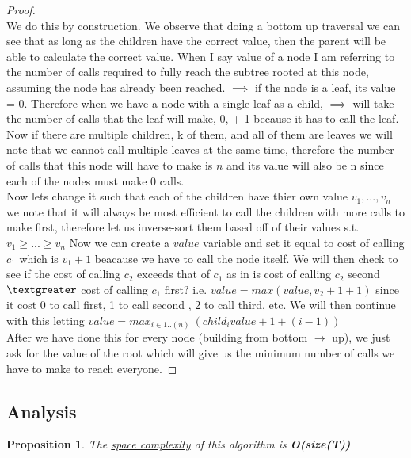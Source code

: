 \documentclass[12pt]{article}
\newtheorem{proposition}[theorem]{Proposition}
\begin{document}
\begin{proof}
~ \\ \indent We do this by construction. We observe that doing a bottom up traversal we can
see that as long as the children have the correct value, then the parent will be able to
calculate the correct value. When I say value of a node I am referring to the number
of calls required to fully reach the subtree rooted at this node, assuming the node has
already been reached. $\implies$ if the node is a leaf, its value = 0. Therefore when we have
a node with a single leaf as a child, $\implies$ will take the number of calls that the
leaf will make, 0, + 1 because it has to call the leaf. Now if there are multiple children,
k of them, and all of them are leaves we will note that we cannot call multiple leaves at
the same time, therefore the number of calls that this node will have to make is $n$ and
its value will also be n since each of the nodes must make 0 calls. \\
\indent Now lets change it such that each of the children have thier own value $v_1,...,v_n$
we note that it will always be most efficient to call the children with more calls to make
first, therefore let us inverse-sort them based off of their values s.t. $v_1\geq...\geq v_n$
Now we can create a $value$ variable and set it equal to cost of calling $c_1$ which is
$v_1 + 1$ beacause we have to call the node itself. We will then check to see if the cost of calling
$c_2$ exceeds that of $c_1$ as in is cost of calling $c_2$ second $\textgreater$ cost of calling
$c_1$ first? i.e. $value = max(value, v_2 + 1 + 1)$ since it cost 0 to call first, 1
to call second , 2 to call third, etc. We will then continue with this letting
$value = max_{i \in 1..(n)}\ (child_{i}value + 1 + (i-1))$ \\
\indent After we have done this for every node (building from bottom $\rightarrow$ up), we
just ask for the value of the root which will give us the minimum number of calls we
have to make to reach everyone.
\end{proof}


\subsection{Analysis}

\begin{proposition}
\label{numq}
The \underline{space complexity} of this algorithm is \textbf{O(size(T))}
\end{proposition}
\end{document}
